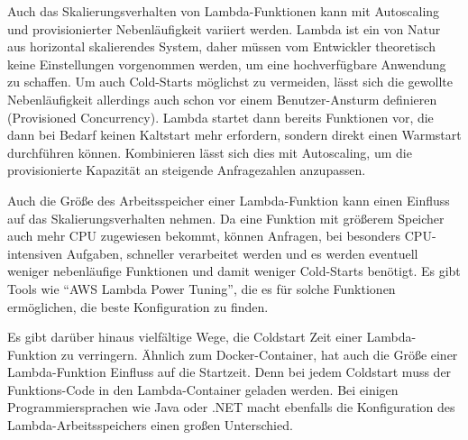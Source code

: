 Auch das Skalierungsverhalten von Lambda-Funktionen kann mit Autoscaling und provisionierter Nebenläufigkeit variiert werden. Lambda ist ein von Natur aus horizontal skalierendes System, daher müssen vom Entwickler theoretisch keine Einstellungen vorgenommen werden, um eine hochverfügbare Anwendung zu schaffen. Um auch Cold-Starts möglichst zu vermeiden, lässt sich die gewollte Nebenläufigkeit allerdings auch schon vor einem Benutzer-Ansturm definieren (Provisioned Concurrency). Lambda startet dann bereits Funktionen vor, die dann bei Bedarf keinen Kaltstart mehr erfordern, sondern direkt einen Warmstart durchführen können. Kombinieren lässt sich dies mit Autoscaling, um die provisionierte Kapazität an steigende Anfragezahlen anzupassen. 

Auch die Größe des Arbeitsspeicher einer Lambda-Funktion kann einen Einfluss auf das Skalierungsverhalten nehmen. Da eine Funktion mit größerem Speicher auch mehr CPU zugewiesen bekommt, können Anfragen, bei besonders CPU-intensiven Aufgaben, schneller verarbeitet werden und es werden eventuell weniger nebenläufige Funktionen und damit weniger Cold-Starts benötigt. Es gibt Tools wie "`AWS Lambda Power Tuning"'\cite{casalboni_alexcasalboniaws-lambda-power-tuning_2021}, die es für solche Funktionen ermöglichen, die beste Konfiguration zu finden.

Es gibt darüber hinaus vielfältige Wege, die Coldstart Zeit einer Lambda-Funktion zu verringern. Ähnlich zum Docker-Container, hat auch die Größe einer Lambda-Funktion Einfluss auf die Startzeit. Denn bei jedem Coldstart muss der Funktions-Code in den Lambda-Container geladen werden. Bei einigen Programmiersprachen wie Java oder .NET macht ebenfalls die Konfiguration des Lambda-Arbeitsspeichers einen großen Unterschied\cite{malishev_aws_2019}. 

